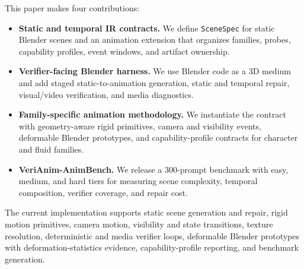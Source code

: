 \documentclass{article}
\newcommand{\code}[1]{\texttt{#1}}
\begin{document}
This paper makes four contributions:
\begin{itemize}
    \item \textbf{Static and temporal IR contracts.} We define \code{SceneSpec} for static Blender scenes and an animation extension that organizes families, probes, capability profiles, event windows, and artifact ownership.
    \item \textbf{Verifier-facing Blender harness.} We use Blender code as a 3D medium and add staged static-to-animation generation, static and temporal repair, visual/video verification, and media diagnostics.
    \item \textbf{Family-specific animation methodology.} We instantiate the contract with geometry-aware rigid primitives, camera and visibility events, deformable Blender prototypes, and capability-profile contracts for character and fluid families.
    \item \textbf{VeriAnim-AnimBench.} We release a 300-prompt benchmark with easy, medium, and hard tiers for measuring scene complexity, temporal composition, verifier coverage, and repair cost.
\end{itemize}
The current implementation supports static scene generation and repair, rigid motion primitives, camera motion, visibility and state transitions, texture resolution, deterministic and media verifier loops, deformable Blender prototypes with deformation-statistics evidence, capability-profile reporting, and benchmark generation.
\end{document}
